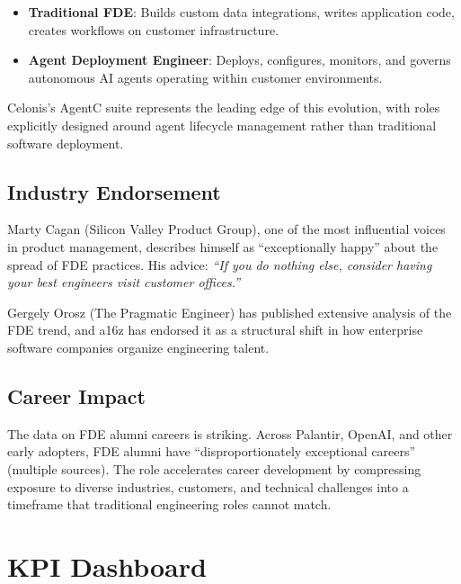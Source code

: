 \begin{itemize}
    \item \textbf{Traditional FDE}: Builds custom data integrations,
        writes application code, creates workflows on customer
        infrastructure.
    \item \textbf{Agent Deployment Engineer}: Deploys, configures,
        monitors, and governs autonomous AI agents operating within
        customer environments.
\end{itemize}

Celonis's AgentC suite represents the leading edge of this evolution,
with roles explicitly designed around agent lifecycle management rather
than traditional software deployment.

\subsection{Industry Endorsement}

Marty Cagan (Silicon Valley Product Group), one of the most influential
voices in product management, describes himself as ``exceptionally happy''
about the spread of FDE practices. His advice: \textit{``If you do
nothing else, consider having your best engineers visit customer
offices.''}

Gergely Orosz (The Pragmatic Engineer) has published extensive analysis
of the FDE trend, and a16z has endorsed it as a structural shift in
how enterprise software companies organize engineering talent.

\subsection{Career Impact}

The data on FDE alumni careers is striking. Across Palantir, OpenAI,
and other early adopters, FDE alumni have ``disproportionately exceptional
careers'' (multiple sources). The role accelerates career development by
compressing exposure to diverse industries, customers, and technical
challenges into a timeframe that traditional engineering roles cannot
match.

\section{KPI Dashboard}

